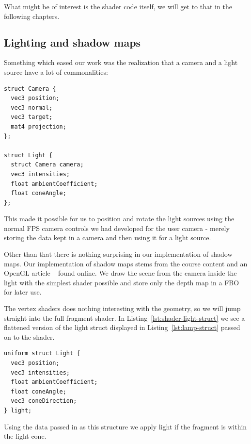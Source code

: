 \documentclass[a4paper,12pt]{article}
\begin{document}
What might be of interest is the shader code itself, we will get to that in the following chapters.


\subsection{Lighting and shadow maps}

Something which eased our work was the realization that a camera and a light source have a lot of commonalities:

\begin{lstlisting}[label=lst:lamp-struct,caption=Light source struct]
struct Camera {
  vec3 position;
  vec3 normal;
  vec3 target;
  mat4 projection;
};

struct Light {
  struct Camera camera;
  vec3 intensities;
  float ambientCoefficient;
  float coneAngle;
};
\end{lstlisting}

This made it possible for us to position and rotate the light sources using the normal FPS camera controls we had developed for the user camera - merely storing the data kept in a camera and then using it for a light source.

Other than that there is nothing surprising in our implementation of shadow maps. Our implementation of shadow maps stems from the course content and an OpenGL article ~\cite{shadow-maps-tutorial} found online. We draw the scene from the camera inside the light with the simplest shader possible and store only the depth map in a FBO for later use.

The vertex shaders does nothing interesting with the geometry, so we will jump straight into the full fragment shader. In Listing~\ref{lst:shader-light-struct} we see a flattened version of the light struct displayed in Listing~\ref{lst:lamp-struct} passed on to the shader.

\begin{lstlisting}[label=lst:shader-light-struct,caption= The light struct received in the shader.]
uniform struct Light {
  vec3 position;
  vec3 intensities;
  float ambientCoefficient;
  float coneAngle;
  vec3 coneDirection;
} light;
\end{lstlisting}

Using the data passed in as this structure we apply light if the fragment is within the light cone.
\end{document}
